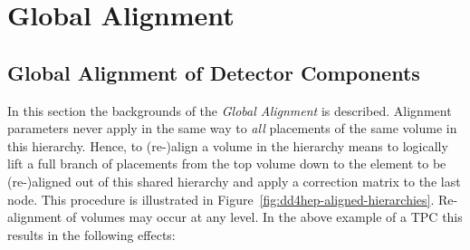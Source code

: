 \documentclass[10pt,a4paper]{article}
\begin{document}
\section{Global Alignment}
\label{sect:ddalign-global-aligments}
\subsection{Global Alignment of Detector Components}
\label{subsect:ddalign-intro-aligments}
\noindent
In this section the backgrounds of the {\it{Global Alignment}} is described.
Alignment parameters never apply in the same way to {\it{all}} placements of the 
same volume in this hierarchy. Hence, to (re-)align a volume in the hierarchy
means to logically lift a full branch of placements from the top volume down to
the element to be (re-)aligned out of this shared hierarchy and apply
a correction matrix to the last node. This procedure is illustrated in 
Figure~\ref{fig:dd4hep-aligned-hierarchies}. Re-alignment of volumes may occur
at any level. In the above example of a TPC this results in the following effects:
\end{document}
